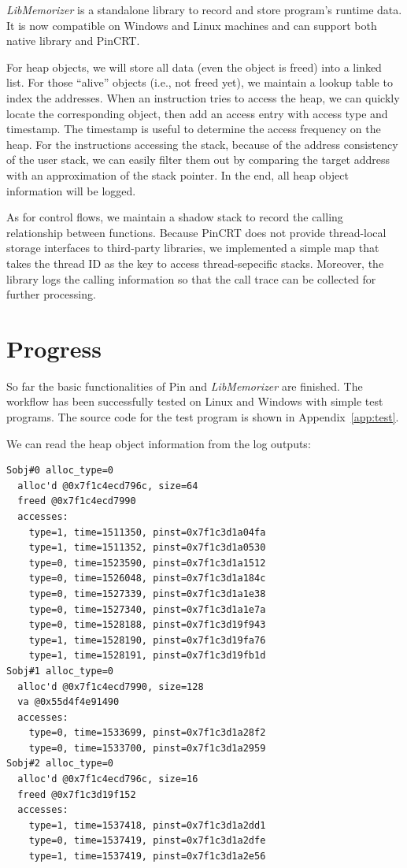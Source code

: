 \documentclass[letterpaper,twocolumn,10pt]{article}
\begin{document}
\textit{LibMemorizer} is a standalone library to record and store program's runtime data.
It is now compatible on Windows and Linux machines and can support both native library and PinCRT.

For heap objects, we will store all data (even the object is freed) into a linked list.
For those ``alive'' objects (i.e., not freed yet), we maintain a lookup table to index the addresses.
When an instruction tries to access the heap, we can quickly locate the corresponding object, then add an access entry with access type and timestamp.
The timestamp is useful to determine the access frequency on the heap.
For the instructions accessing the stack, because of the address consistency of the user stack, we can easily filter them out by comparing the target address with an approximation of the stack pointer.
In the end, all heap object information will be logged.

As for control flows, we maintain a shadow stack to record the calling relationship between functions.
Because PinCRT does not provide thread-local storage interfaces to third-party libraries, we implemented a simple map that takes the thread ID as the key to access thread-sepecific stacks.
Moreover, the library logs the calling information so that the call trace can be collected for further processing.

\section{Progress}

So far the basic functionalities of Pin and \textit{LibMemorizer} are finished.
The workflow has been successfully tested on Linux and Windows with simple test programs.
The source code for the test program is shown in Appendix~\ref{app:test}.

We can read the heap object information from the log outputs:

\small
\begin{verbatim}
Sobj#0 alloc_type=0
  alloc'd @0x7f1c4ecd796c, size=64
  freed @0x7f1c4ecd7990
  accesses:
    type=1, time=1511350, pinst=0x7f1c3d1a04fa
    type=1, time=1511352, pinst=0x7f1c3d1a0530
    type=0, time=1523590, pinst=0x7f1c3d1a1512
    type=0, time=1526048, pinst=0x7f1c3d1a184c
    type=0, time=1527339, pinst=0x7f1c3d1a1e38
    type=0, time=1527340, pinst=0x7f1c3d1a1e7a
    type=0, time=1528188, pinst=0x7f1c3d19f943
    type=1, time=1528190, pinst=0x7f1c3d19fa76
    type=1, time=1528191, pinst=0x7f1c3d19fb1d
Sobj#1 alloc_type=0
  alloc'd @0x7f1c4ecd7990, size=128
  va @0x55d4f4e91490
  accesses:
    type=0, time=1533699, pinst=0x7f1c3d1a28f2
    type=0, time=1533700, pinst=0x7f1c3d1a2959
Sobj#2 alloc_type=0
  alloc'd @0x7f1c4ecd796c, size=16
  freed @0x7f1c3d19f152
  accesses:
    type=1, time=1537418, pinst=0x7f1c3d1a2dd1
    type=0, time=1537419, pinst=0x7f1c3d1a2dfe
    type=1, time=1537419, pinst=0x7f1c3d1a2e56
\end{verbatim}
\normalsize
\end{document}
